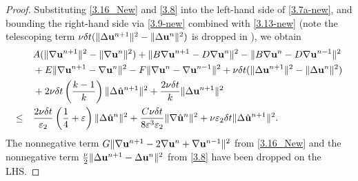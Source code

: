 \documentclass{article}
\theoremstyle{definition}                   %
\begin{document}
\begin{proof}
Substituting \eqref{3.16_New} and \eqref{3.8}  into the
left-hand side of \eqref{3.7a-new}, and bounding the right-hand side via
\eqref{3.9-new} combined with \eqref{3.13-new} (note the 
telescoping term $\nu\delta t(\|\Delta{\bf u}^{n+1}\|^2-\|\Delta{\bf u}^n\|^2)$
is dropped in \cite{HuangShen2023}), we obtain
\begin{align}
&A(\|\nabla{\bf u}^{n+1}\|^2 - \|\nabla{\bf u}^{n}\|^2)
+\|B\nabla{\bf u}^{n+1} - D\nabla{\bf u}^n\|^2
- \|B\nabla{\bf u}^{n} - D\nabla{\bf u}^{n-1}\|^2
\notag\\
& + E\|\nabla{\bf u}^{n+1} - \nabla{\bf u}^n\|^2
- F\|\nabla{\bf u}^{n} - \nabla{\bf u}^{n-1}\|^2
+\nu\delta t (\|\Delta{\bf u}^{n+1}\|^2
-\|\Delta{\bf u}^{n}\|^2 )
\notag\\
&+ 2\nu\delta t \left(\frac{k-1}{k}\right)
\|\Delta \hat{\bf u}^{n+1}\|^2
+ \frac{2\nu\delta t}{k} \|\Delta{\bf u}^{n+1}\|^2
\notag\\
 \le\quad& \frac{2\nu\delta t}{\varepsilon_2}\left(\frac{1}{4} + \varepsilon  \right) \|\Delta \hat{\bf u}^n \|^2
+ \frac{C\nu\delta t}{8 \varepsilon^3 \varepsilon_2}
\|\nabla \hat{\bf u}^n \|^2
+\nu \varepsilon_2\delta t \|\Delta \hat{\bf u}^{n+1}\|^2.
\label{3.17-new}
\end{align}
The nonnegative term
$G\|\nabla{\bf u}^{n+1}-2\nabla{\bf u}^n+\nabla{\bf u}^{n-1}\|^2$ from
\eqref{3.16_New} and the nonnegative term
$\frac{\nu}{2}\|\Delta{\bf u}^{n+1}-\Delta{\bf u}^n\|^2$ from \eqref{3.8} have
been dropped on the LHS.


\end{proof}
\end{document}
